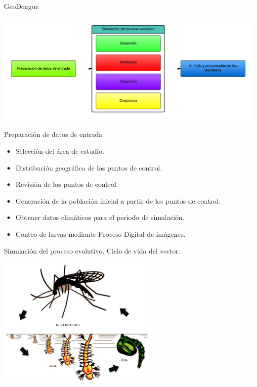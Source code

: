 
\begin{frame}[c]{GeoDengue}
  \begin{center}
      \includegraphics[width=\textwidth]{./graphics/propuesta.png}
  \end{center}
\end{frame}


\begin{frame}[c]{Preparación de datos de entrada}
  \begin{center}
    \begin{itemize}
      \item Selección del área de estudio.
      \item Distribución geográfica de los puntos de control.
      \item Revisión de los puntos de control.
      \item Generación de la población inicial a partir de los puntos de control.
      \item Obtener datos climáticos para el periodo de simulación.
      \item Conteo de larvas mediante Proceso Digital de imágenes.
    \end{itemize}
  \end{center}
\end{frame}


\begin{frame}[c]{Simulación del proceso evolutivo. Ciclo de vida del vector.}
  \begin{center}
      \includegraphics[width=7.8cm]{./graphics/ciclo-de-vida.jpg}
  \end{center}
\end{frame}


